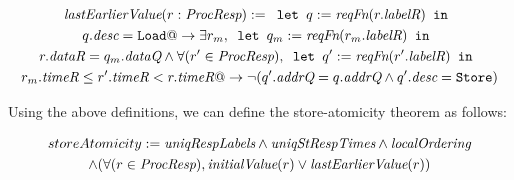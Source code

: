 \begin{defn}
\begin{multline*}
\textit{lastEarlierValue} (r: \textit{ProcResp}) := \texttt{ let } q := \textit{reqFn} (r.\textit{labelR}) \texttt{ in }\\
q.\textit{desc} = \texttt{Load} @-> \exists r_m, \texttt{ let } q_m := \textit{reqFn} (r_m.\textit{labelR}) \texttt{ in }\\
r.\textit{dataR} = q_m.\textit{dataQ} \wedge
\forall (r' \in \textit{ProcResp}), \texttt{ let } q' := \textit{reqFn} (r'.\textit{labelR}) \texttt{ in } \\ r_m.\textit{timeR} \le r'.\textit{timeR} < r.\textit{timeR} @->
\neg (q'.\textit{addrQ} = q.\textit{addrQ} \wedge q'.\textit{desc} = \texttt{Store})
\end{multline*}
\end{defn}

Using the above definitions, we can define the store-atomicity theorem as follows:
\begin{thm}
\begin{multline*}
storeAtomicity := 
\textit{uniqRespLabels} \wedge
\textit{uniqStRespTimes} \wedge \textit{localOrdering}\\ \wedge 
(\forall (r \in \textit{ProcResp}), \textit{initialValue}(r) \vee \textit{lastEarlierValue}(r))
\end{multline*}
\end{thm}
